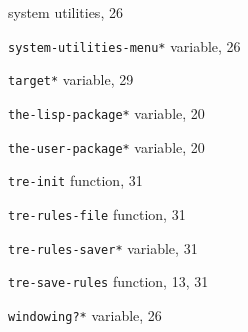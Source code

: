 \begin{theindex}
\item system utilities, 26
\item {\tt *system-utilities-menu*} variable, 26
\indexspace
\item {\tt *target*} variable, 29
\item {\tt *the-lisp-package*} variable, 20
\item {\tt *the-user-package*} variable, 20
\item {\tt tre-init} function, 31
\item {\tt tre-rules-file} function, 31
\item {\tt *tre-rules-saver*} variable, 31
\item {\tt tre-save-rules} function, 13, 31
\indexspace
\item {\tt *windowing?*} variable, 26
\indexspace
\end{theindex}




